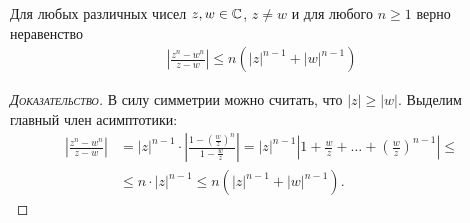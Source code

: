 \documentclass[../complex-analysis.tex]{subfiles}
\begin{document}
\begin{lm}
 \label{lemma:complex_n_w_inequality}
 Для любых различных чисел $z, w \in \mathbb{C}$, $z \neq w$ и для любого $n \geqslant 1$ верно неравенство
 \begin{align*}
  \left|\frac{z^{n} - w^{n}}{z - w} \right| \leqslant n \left(\left| z \right|^{n-1} + \left| w \right|^{n-1}\right)
 \end{align*} 
\end{lm}
\begin{proof}[\normalfont\textsc{Доказательство}]
 В силу симметрии можно считать, что $\left| z \right| \geqslant \left| w \right|$. Выделим главный член асимптотики:
 \begin{align*}
  \left| \frac{z^{n}-w^{n}}{z-w} \right| &= \left| z \right|^{n-1} \cdot \left| \frac{1 - \left( \frac{w}{z} \right)^{n}}{1 - \frac{w}{z}} \right| = \left| z \right|^{n-1} \left| 1 + \frac{w}{z} + \ldots + \left( \frac{w}{z} \right)^{n-1} \right| \leqslant \\
  &\leqslant n \cdot \left| z \right|^{n-1} \leqslant n \left( \left| z \right|^{n-1} + \left| w \right|^{n-1} \right).
 \end{align*} 
\end{proof}
\end{document}
